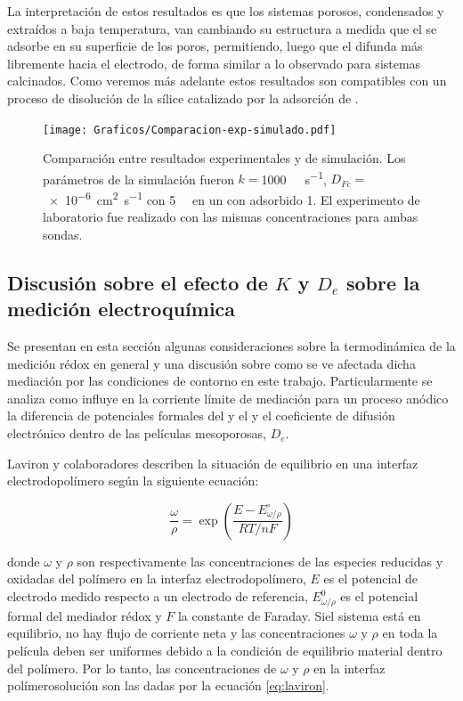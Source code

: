 		La interpretación de estos resultados es que los sistemas porosos, condensados y extraídos a baja temperatura, van cambiando su estructura a medida que el \ru\space se adsorbe en su superficie de los poros, permitiendo, luego que el \fc\space difunda más libremente hacia el electrodo, de forma similar a lo observado para sistemas calcinados. Como veremos más adelante estos resultados son compatibles con un proceso de disolución de la sílice catalizado por la adsorción de \aminorutenio.

				\begin{figure}[h!]
					\centering
			 	    \texttt{[image: Graficos/Comparacion-exp-simulado.pdf]}
			        \caption[Simulación EQ comparadas con datos experimentales]{Comparación entre resultados experimentales y de simulación. Los parámetros de la simulación fueron $k=$\SI{1000}{\per\Molar\per\second}, $D_{Fc}\!=$ \SI{e-6}{\square\cm\per\second} con \fc\space \SI{5}{\milli\Molar} en un \pdm\space con \ru\space adsorbido \SI{1}{\Molar}. El experimento de laboratorio fue realizado con las mismas concentraciones para ambas sondas.}
			        \label{fig:comp_sim_exp}
			      	\end{figure}

	\subsection{Discusión sobre el efecto de \texorpdfstring{$K$}{K} y \texorpdfstring{$D_e$}{De} sobre la medición electroquímica}

		Se presentan en esta sección algunas consideraciones sobre la termodinámica de la medición rédox en general y una discusión sobre como se ve afectada dicha mediación por las condiciones de contorno en este trabajo. Particularmente se analiza como influye en la corriente límite de mediación para un proceso anódico la diferencia de potenciales formales del \ru\space y el \fc\space y el coeficiente de difusión electrónico dentro de las películas mesoporosas, $D_e$.

		Laviron y colaboradores\cite{laviron1983} describen la situación de equilibrio en una interfaz electrodo\textbar polímero según la siguiente ecuación:

			\begin{equation}
				\frac{\omega}{\rho} = \exp{\left(\frac{E-E_{\omega / \rho}^{\circ}}{RT/nF}\right)}
				\label{eq:laviron}
			\end{equation}

		\noindent donde $\omega$ y $\rho$ son respectivamente las concentraciones de las especies reducidas y oxidadas del polímero en la interfaz electrodo\textbar polímero, $E$ es el potencial de electrodo medido respecto a un electrodo de referencia, $E_{\omega / \rho}^{0}$ es el potencial formal del mediador rédox y $F$ la constante de Faraday. Si\space el sistema está en equilibrio, no hay flujo de corriente neta y las concentraciones $\omega$ y $\rho$ en toda la película deben ser uniformes debido a la condición de equilibrio material dentro del polímero. Por lo tanto, las concentraciones de $\omega$ y $\rho$ en la interfaz polímero\textbar solución son las dadas por la ecuación \ref{eq:laviron}.

